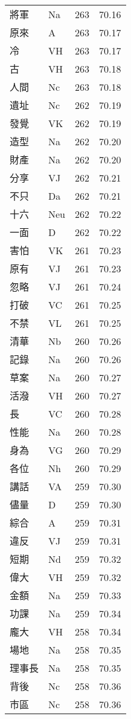 \documentclass[twocolumn]{book}
\begin{document}
\begin{supertabular}{llrr}
將軍 & Na & 263 &  70.16\\
原來 & A & 263 &  70.17\\
冷 & VH & 263 &  70.17\\
古 & VH & 263 &  70.18\\
人間 & Nc & 263 &  70.18\\
遺址 & Nc & 262 &  70.19\\
發覺 & VK & 262 &  70.19\\
造型 & Na & 262 &  70.20\\
財產 & Na & 262 &  70.20\\
分享 & VJ & 262 &  70.21\\
不只 & Da & 262 &  70.21\\
十六 & Neu & 262 &  70.22\\
一面 & D & 262 &  70.22\\
害怕 & VK & 261 &  70.23\\
原有 & VJ & 261 &  70.23\\
忽略 & VJ & 261 &  70.24\\
打破 & VC & 261 &  70.25\\
不禁 & VL & 261 &  70.25\\
清華 & Nb & 260 &  70.26\\
記錄 & Na & 260 &  70.26\\
草案 & Na & 260 &  70.27\\
活潑 & VH & 260 &  70.27\\
長 & VC & 260 &  70.28\\
性能 & Na & 260 &  70.28\\
身為 & VG & 260 &  70.29\\
各位 & Nh & 260 &  70.29\\
講話 & VA & 259 &  70.30\\
儘量 & D & 259 &  70.30\\
綜合 & A & 259 &  70.31\\
違反 & VJ & 259 &  70.31\\
短期 & Nd & 259 &  70.32\\
偉大 & VH & 259 &  70.32\\
金額 & Na & 259 &  70.33\\
功課 & Na & 259 &  70.34\\
龐大 & VH & 258 &  70.34\\
場地 & Na & 258 &  70.35\\
理事長 & Na & 258 &  70.35\\
背後 & Nc & 258 &  70.36\\
市區 & Nc & 258 &  70.36\\

\end{supertabular}
\end{document}
